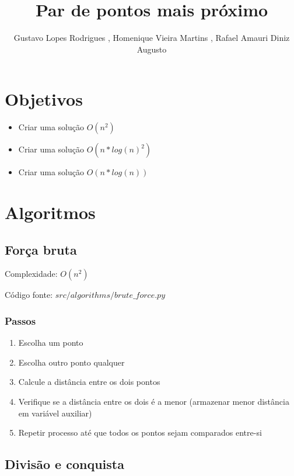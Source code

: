 \documentclass[10pt,a4paper]{article}
\author{Gustavo Lopes Rodrigues , Homenique Vieira Martins , Rafael Amauri Diniz Augusto}
\title{\textbf{Par de pontos mais próximo}}
\begin{document}
	\maketitle

    \section*{Objetivos}

	\begin{itemize}
        \item Criar uma solução $O(n^{2})$
        \item Criar uma solução $O(n*log(n)^{2})$
        \item Criar uma solução $O(n*log(n))$
    \end{itemize}

    \section{Algoritmos}

    \subsection{Força bruta}

    Complexidade: $O(n^{2})$

    Código fonte: $src/algorithms/brute\_force.py$

    \subsubsection{Passos}

    \begin{enumerate}
        \item Escolha um ponto 
        \item Escolha outro ponto qualquer 
        \item Calcule a distância entre os dois pontos 
        \item Verifique se a distância entre os dois é a menor 
        (armazenar menor distância em variável auxiliar)
        \item Repetir processo até que todos os pontos sejam comparados entre-si
    \end{enumerate}

    \newpage

    \subsection{Divisão e conquista}
\end{document}
